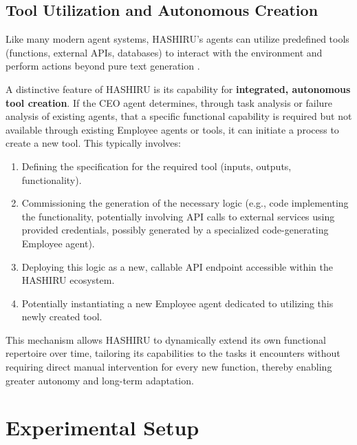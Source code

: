 \documentclass[conference]{IEEEtran}
\begin{document}
\subsection{Tool Utilization and Autonomous Creation}
\label{subsec:tooling}
Like many modern agent systems, HASHIRU's agents can utilize predefined tools (functions, external APIs, databases) to interact with the environment and perform actions beyond pure text generation \cite{yao2022react, openai_func_calling}.

A distinctive feature of HASHIRU is its capability for \textbf{integrated, autonomous tool creation}. If the CEO agent determines, through task analysis or failure analysis of existing agents, that a specific functional capability is required but not available through existing Employee agents or tools, it can initiate a process to create a new tool. This typically involves:
\begin{enumerate}
    \item Defining the specification for the required tool (inputs, outputs, functionality).
    \item Commissioning the generation of the necessary logic (e.g., code implementing the functionality, potentially involving API calls to external services using provided credentials, possibly generated by a specialized code-generating Employee agent).
    \item Deploying this logic as a new, callable API endpoint accessible within the HASHIRU ecosystem.
    \item Potentially instantiating a new Employee agent dedicated to utilizing this newly created tool.
\end{enumerate}
This mechanism allows HASHIRU to dynamically extend its own functional repertoire over time, tailoring its capabilities to the tasks it encounters without requiring direct manual intervention for every new function, thereby enabling greater autonomy and long-term adaptation.


\section{Experimental Setup}
\label{sec:experiments}
\end{document}

